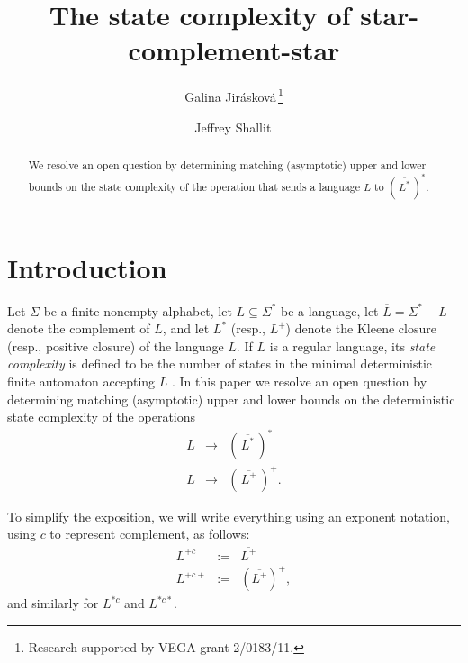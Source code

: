 \documentclass[runningheads]{llncs}
\begin{document}
\title{The state complexity of star-complement-star}
\author{
Galina Jir\'{a}skov\'{a}\,\thanks{Research supported by  VEGA grant  2/0183/11.}
  \and 
   Jeffrey Shallit\,}

\maketitle

\begin{abstract}
\label{***abstract}
We resolve an open question by determining matching (asymptotic) 
upper and lower bounds on the state complexity of the
operation that sends a language $L$ to 
$\left( \, \overline{L^*} \, \right)^*$.
\end{abstract}
  
\section{Introduction}
\label{***intro}

Let $\Sigma$ be a finite nonempty alphabet, let $L \subseteq \Sigma^*$ be
a language, let $\overline{L} = \Sigma^* - L$ denote the complement of
$L$, and let $L^*$ (resp., $L^+$) denote the Kleene closure
(resp., positive closure) of the language $L$.
If $L$ is a regular language, its {\it state complexity\/}
is defined to be the number of states in the minimal deterministic
finite automaton accepting $L$ \cite{yzs94}.
In this paper we resolve an open question by determining matching
(asymptotic) upper and
lower bounds on the deterministic state complexity of the operations
\begin{eqnarray*}
L  &\rightarrow& \left( \, \overline{L^*} \, \right)^* \\
L  &\rightarrow& \left( \, \overline{L^+} \, \right)^+ .
\end{eqnarray*}

To simplify the exposition, we will write everything using an exponent notation,
using $c$ to represent complement,
as follows:
\begin{eqnarray*}
L^{+c} &:=& \overline{L^+} \\
L^{+c+} &:=& (\overline{L^+})^+,
\end{eqnarray*}
and similarly for $L^{*c}$ and $L^{*c*}$.
\end{document}
